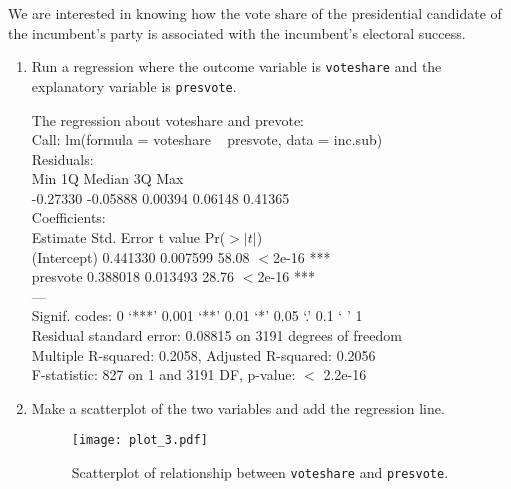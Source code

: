 \documentclass[12pt,letterpaper]{article}
\begin{document}
\noindent We are interested in knowing how the vote share of the presidential candidate of the incumbent's party is associated with the incumbent's electoral success.
	\vspace{.25cm}
	\begin{enumerate}
		\item Run a regression where the outcome variable is \texttt{voteshare} and the explanatory variable is \texttt{presvote}.
			
			\vspace{.15cm}
			 
			\vspace{.15cm}
			\noindent The regression about voteshare and prevote:\\
			Call:
			lm(formula = voteshare ~ presvote, data = inc.sub)\\
			
			Residuals:\\
			Min       1Q   Median       3Q      Max \\
			-0.27330 -0.05888  0.00394  0.06148  0.41365 \\
			
			Coefficients:\\
			Estimate Std. Error t value Pr($>|t|$)    \\
			(Intercept) 0.441330   0.007599   58.08   $<$2e-16 ***\\
			presvote    0.388018   0.013493   28.76   $<$2e-16 ***\\
			---\\ 
			Signif. codes:  0 ‘***’ 0.001 ‘**’ 0.01 ‘*’ 0.05 ‘.’ 0.1 ‘ ’ 1\\
			
			Residual standard error: 0.08815 on 3191 degrees of freedom\\
			Multiple R-squared:  0.2058,	Adjusted R-squared:  0.2056 \\
			F-statistic:   827 on 1 and 3191 DF,  p-value: $<$ 2.2e-16\\
		\item Make a scatterplot of the two variables and add the regression line. 
		
		\vspace{.15cm}
		 
		\vspace{.15cm}
		\begin{figure}[h!]\centering
			
			\caption{\footnotesize Scatterplot of relationship between \texttt{voteshare} and \texttt{presvote}.}
			\label{fig:plot_3}
			\texttt{[image: plot\_3.pdf]}
		\end{figure}
		

\end{enumerate}
\end{document}
